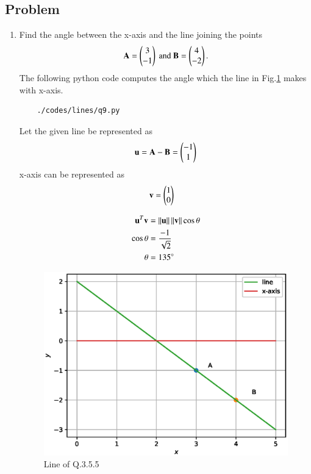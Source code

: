 \subsection{Problem}

\renewcommand{\theequation}{\theenumi}
\begin{enumerate}[label=\thesection.\arabic*.,ref=\thesection.\theenumi]
	\item Find the angle between the x-axis and the line joining the points 
	\begin{align}
\mathbf{A} = \begin{pmatrix}3\\-1\end{pmatrix}\text{ and }\mathbf{B} = \begin{pmatrix}4\\-2\end{pmatrix}.
	\end{align}
	The following python code computes the angle which the line in Fig.\ref{fig:qnine} makes with x-axis.
	\begin{lstlisting}
	./codes/lines/q9.py
	\end{lstlisting}
	
	\solution Let the given line be represented as 
	\begin{align}
	\mathbf{u} = \mathbf{A-B} = \begin{pmatrix}-1\\1\end{pmatrix}
	\end{align}
	x-axis can be represented as
	\begin{align}
	\mathbf{v} &= \begin{pmatrix}1\\0\end{pmatrix}
	\end{align}

\begin{align}
\mathbf{u}^T\mathbf{v} &= \left\lVert\mathbf{u}\right\rVert\left\lVert\mathbf{v}\right\rVert\cos{\theta}
	\\
	\cos{\theta} &= \frac{-1}{\sqrt{2}}
	\\
	\theta &= 135\degree 
\end{align}

	\begin{figure}[!ht]
	\centering
	\includegraphics[width=\columnwidth]{./figs/lines/q9.eps}
	\caption{Line of Q.3.5.5}
	\label{fig:qnine}	
	\end{figure}
	
\end{enumerate}

